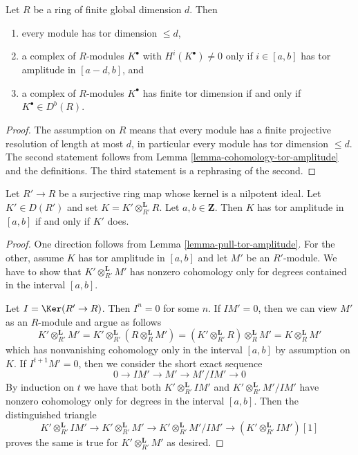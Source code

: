 \begin{lemma}
\label{lemma-finite-gl-dim-tor-dimension}
Let $R$ be a ring of finite global dimension $d$. Then
\begin{enumerate}
\item every module has tor dimension $\leq d$,
\item a complex of $R$-modules $K^\bullet$ with $H^i(K^\bullet) \not = 0$
only if $i \in [a, b]$ has tor amplitude in $[a - d, b]$, and
\item a complex of $R$-modules $K^\bullet$ has finite tor dimension if and only
if $K^\bullet \in D^b(R)$.
\end{enumerate}
\end{lemma}

\begin{proof}
The assumption on $R$ means that every module has a finite projective
resolution of length at most $d$, in particular every module has
tor dimension $\leq d$. The second statement follows from
Lemma \ref{lemma-cohomology-tor-amplitude}
and the definitions. The third statement is a rephrasing of the second.
\end{proof}

\begin{lemma}
\label{lemma-check-tor-dimension-modulo-nilpotent}
Let $R' \to R$ be a surjective ring map whose kernel is a nilpotent ideal.
Let $K' \in D(R')$ and set $K = K' \otimes_{R'}^\mathbf{L} R$.
Let $a, b \in \mathbf{Z}$.
Then $K$ has tor amplitude in $[a, b]$ if and only if $K'$ does.
\end{lemma}

\begin{proof}
One direction follows from Lemma \ref{lemma-pull-tor-amplitude}.
For the other, assume $K$ has tor amplitude in $[a, b]$ and let
$M'$ be an $R'$-module. We have to show that $K' \otimes_{R'}^\mathbf{L} M'$
has nonzero cohomology only for degrees contained in the interval $[a, b]$.

\medskip\noindent
Let $I = \Ker(R' \to R)$. Then $I^n = 0$ for some $n$. If $IM' = 0$,
then we can view $M'$ as an $R$-module and argue as follows
$$
K' \otimes_{R'}^\mathbf{L} M' =
K' \otimes_{R'}^\mathbf{L} (R \otimes_R^\mathbf{L} M') =
(K' \otimes_{R'}^\mathbf{L} R) \otimes_R^\mathbf{L} M' =
K \otimes_R^\mathbf{L} M'
$$
which has nonvanishing cohomology only in the interval $[a, b]$
by assumption on $K$. If $I^{t + 1}M' = 0$, then we consider the
short exact sequence
$$
0 \to IM' \to M' \to M'/IM' \to 0
$$
By induction on $t$ we have that both $K' \otimes_{R'}^\mathbf{L} IM'$
and $K' \otimes_{R'}^\mathbf{L} M'/IM'$ have nonzero cohomology only for
degrees in the interval $[a, b]$. Then the distinguished triangle
$$
K' \otimes_{R'}^\mathbf{L} IM' \to
K' \otimes_{R'}^\mathbf{L} M' \to
K' \otimes_{R'}^\mathbf{L} M'/IM' \to
(K' \otimes_{R'}^\mathbf{L} IM')[1]
$$
proves the same is true for $K' \otimes_{R'}^\mathbf{L} M'$ as desired.
\end{proof}







